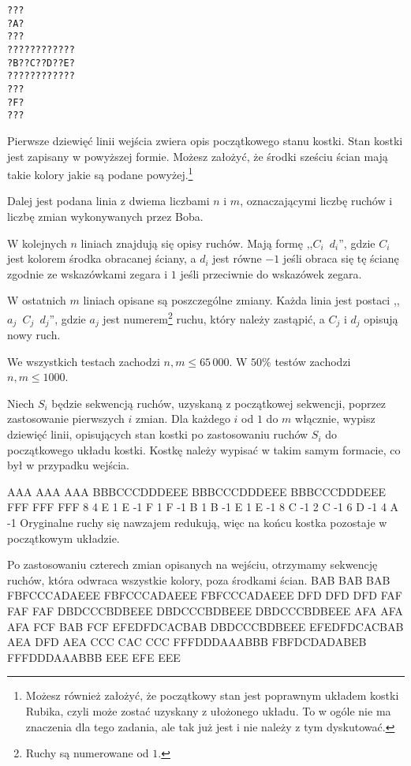 \noindent
\texttt{???} \\
\texttt{?A?} \\
\texttt{???} \\
\texttt{????????????} \\
\texttt{?B??C??D??E?} \\
\texttt{????????????} \\
\texttt{???} \\
\texttt{?F?} \\
\texttt{???} \\


Pierwsze dziewięć linii wejścia zwiera opis początkowego stanu kostki.
Stan kostki jest zapisany w powyższej formie.
Możesz założyć, że środki sześciu ścian mają takie kolory jakie są podane
	powyżej.\footnote{Możesz również założyć, że początkowy stan jest poprawnym układem kostki Rubika,
		czyli może zostać uzyskany z ułożonego układu.
		To w ogóle nie ma znaczenia dla tego zadania, ale tak już jest i nie należy z tym dyskutować.}

Dalej jest podana linia z dwiema liczbami $n$ i $m$, oznaczającymi liczbę ruchów i liczbę zmian wykonywanych przez Boba.

W kolejnych $n$ liniach znajdują się opisy ruchów.
Mają formę ,,\texttt{$C_i$ $d_i$}'', gdzie $C_i$ jest kolorem środka obracanej ściany, a $d_i$ jest równe $-1$
	jeśli obraca się tę ścianę zgodnie ze wskazówkami zegara i $1$ jeśli przeciwnie do wskazówek zegara.

W ostatnich $m$ liniach opisane są poszczególne zmiany.
Każda linia jest postaci ,,\texttt{$a_j$ $C_j$ $d_j$}'', gdzie $a_j$ jest numerem\footnote{Ruchy są numerowane od $1$.}
	ruchu, który należy zastąpić, a $C_j$ i $d_j$ opisują nowy ruch.

We wszystkich testach zachodzi $n, m \le 65\,000$.
W $50\%$ testów zachodzi $n, m \le 1000$.

\newpage


Niech $S_i$ będzie sekwencją ruchów, uzyskaną z początkowej sekwencji, poprzez zastosowanie pierwszych $i$ zmian.
Dla każdego $i$ od $1$ do $m$ włącznie, wypisz dziewięć linii, opisujących stan kostki po zastosowaniu
	ruchów $S_i$ do początkowego układu kostki.
Kostkę należy wypisać w takim samym formacie, co był w przypadku wejścia.


\sampleIN
AAA
AAA
AAA
BBBCCCDDDEEE
BBBCCCDDDEEE
BBBCCCDDDEEE
FFF
FFF
FFF
8 4
E 1
E -1
F 1
F -1
B 1
B -1
E 1
E -1
8 C -1
2 C -1
6 D -1
4 A -1
\sampleCOMMENT
Oryginalne ruchy się nawzajem redukują, więc na końcu kostka pozostaje w początkowym układzie.

\vspace{0.2cm}

Po zastosowaniu czterech zmian opisanych na wejściu,
	otrzymamy sekwencję ruchów, która odwraca wszystkie kolory, poza środkami ścian.
\sampleOUT
BAB
BAB
BAB
FBFCCCADAEEE
FBFCCCADAEEE
FBFCCCADAEEE
DFD
DFD
DFD
FAF
FAF
FAF
DBDCCCBDBEEE
DBDCCCBDBEEE
DBDCCCBDBEEE
AFA
AFA
AFA
FCF
BAB
FCF
EFEDFDCACBAB
DBDCCCBDBEEE
EFEDFDCACBAB
AEA
DFD
AEA
CCC
CAC
CCC
FFFDDDAAABBB
FBFDCDADABEB
FFFDDDAAABBB
EEE
EFE
EEE
\sampleEND


